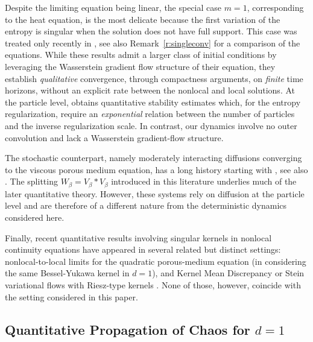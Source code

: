 \documentclass[11pt]{article}
\theoremstyle{definition}
\begin{document}
Despite the limiting equation being linear, the special case \(m=1\), corresponding to the heat
equation, is the most delicate because the first variation of the entropy is
singular when the solution does not have full support.
This case was treated only recently in
\cite{craig2025nonlocal,carrillo2024nonlocallinear}, see also
Remark~\ref{r:singleconv} for a comparison of the equations. 
While these results admit a larger class of initial conditions by leveraging the Wasserstein gradient flow structure of their equation, they establish \emph{qualitative} convergence, through compactness arguments, on
\emph{finite} time horizons, without an explicit rate between the nonlocal and
local solutions. At the particle level,
\cite{carrillo2024nonlocallinear} obtains quantitative stability estimates
which, for the entropy regularization, require an \emph{exponential}
relation between the number of particles and the inverse regularization scale.
In contrast, our dynamics involve no outer convolution and lack a Wasserstein
gradient-flow structure.

The stochastic counterpart, namely moderately interacting diffusions
converging to the viscous porous medium equation, has a long history starting
with
\cite{oelschlager1985law,oelschlager1990large,oelschlager2001sequence}, see also
\cite{figalli2008convergence,morale2005interacting,
chen2021rigorous}. The splitting
\(W_\beta=V_\beta*V_\beta\) introduced in this literature underlies much of the
later quantitative theory. However, these systems rely on diffusion at the particle
level and are therefore of a different nature from the deterministic dynamics
considered here.


Finally, recent quantitative results involving singular kernels in nonlocal continuity equations have appeared in several related but distinct settings: nonlocal-to-local limits for the quadratic porous-medium equation \cite{carrillo2025rate, carrillo2026new,amassad2025deterministic}  (in \cite{carrillo2025rate} considering the same Bessel-Yukawa kernel in $d = 1$), and Kernel Mean Discrepancy or Stein variational flows with Riesz-type kernels \cite{chizat2026quantitative_kmd,chizat2026quantitative_svgd}. None of those, however, coincide with the setting considered in this paper.



\subsection{Quantitative Propagation of Chaos \texorpdfstring{for $d=1$}{in Dimension One}}\label{sec:particles_intro}
\end{document}
